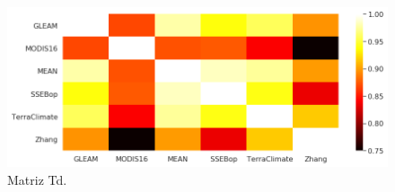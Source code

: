 \begin{figure}[htb]
	\includegraphics[scale=.7]{Images/03_Tindex_AEproducts.png}
	\centering
	\caption{Matriz Td.}
	\label{fig:03_Tindex_AEproducts}
\end{figure}
